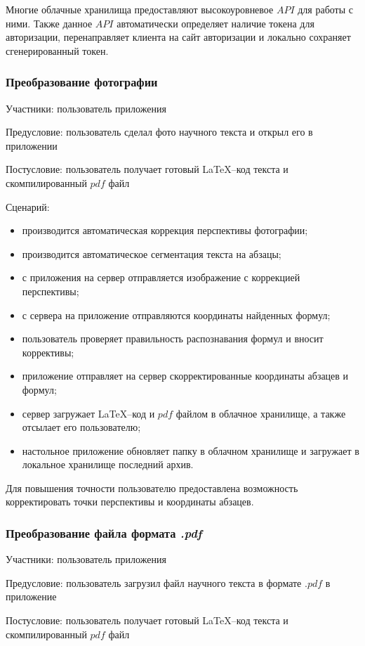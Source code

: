 Многие облачные хранилища предоставляют высокоуровневое $API$ для работы с ними. Также данное $API$ автоматически определяет наличие токена для авторизации, перенаправляет клиента на сайт авторизации и локально сохраняет сгенерированный токен.

\subsubsection{Преобразование фотографии}
Участники: пользователь приложения

Предусловие: пользователь сделал фото научного текста и открыл его в приложении

Постусловие: пользователь получает готовый \LaTeX--код текста и скомпилированный $pdf$ файл

Сценарий:
\begin{itemize}
    \item производится автоматическая коррекция перспективы фотографии;
    \item производится автоматическое сегментация текста на абзацы;
    \item с приложения на сервер отправляется изображение с коррекцией перспективы;
    \item с сервера на приложение отправляются координаты найденных формул;
    \item пользователь проверяет правильность распознавания формул и вносит коррективы;
    \item приложение отправляет на сервер скорректированные координаты абзацев и формул;
    \item сервер загружает \LaTeX--код и $pdf$ файлом в облачное хранилище, а также отсылает его пользователю;
    \item настольное приложение обновляет папку в облачном хранилище и загружает в локальное хранилище последний архив.
\end{itemize}

Для повышения точности пользователю предоставлена возможность корректировать точки перспективы и координаты абзацев.
\subsubsection{Преобразование файла формата \textit{.pdf}}
Участники: пользователь приложения

Предусловие: пользователь загрузил файл научного текста в формате $.pdf$ в приложение

Постусловие: пользователь получает готовый \LaTeX--код текста и скомпилированный $pdf$ файл

